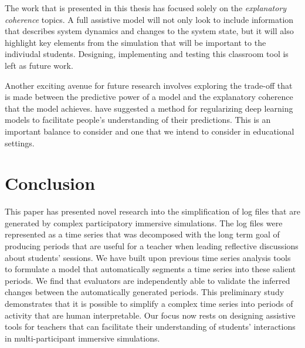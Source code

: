 The work that is presented in this thesis has focused solely on the \textit{explanatory coherence} topics. A full assistive model will not only look to include information that describes system dynamics and changes to the system state, but it will also highlight key elements from the simulation that will be important to the indiviudal students. Designing, implementing and testing this classroom tool is left as future work.

Another exciting avenue for future research involves exploring the trade-off that is made between the predictive power of a model and the explanatory coherence that the model achieves. \cite{wu2017beyond} have suggested a method for regularizing deep learning models to facilitate people's understanding of their predictions. This is an important balance to consider and one that we intend to consider in educational settings.

\section{Conclusion}

This paper has presented novel research into the simplification of log files that are generated by complex participatory immersive simulations. The log files were represented as a time series that was decomposed with the long term goal of producing periods that are useful for a teacher when leading reflective discussions about students' sessions. We have built upon previous time series analysis tools to formulate a model that automatically segments a time series into these salient periods. We find that evaluators are independently able to validate the inferred changes between the automatically generated periods. This preliminary study demonstrates that it is possible to simplify a complex time series into periods of activity that are human interpretable.  Our focus now rests on designing assistive tools for teachers that can facilitate their understanding of students' interactions in multi-participant immersive simulations.
